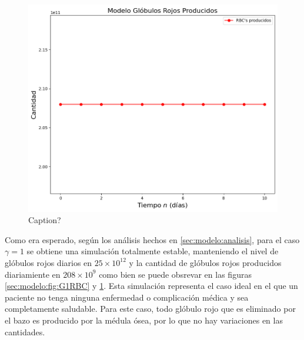 \begin{figure}[H]
    \centering
    \includegraphics[scale=0.57]{figures/BaseG1SC.png}
    \caption{Caption?}
    \label{sec:modelo:fig:G1SC}
\end{figure}
Como era esperado, según los análisis hechos en \ref{sec:modelo:analisis}, para el caso $\gamma = 1$ se obtiene una simulación totalmente estable, manteniendo el nivel de glóbulos rojos diarios en $25\times 10^{12}$ y la cantidad de glóbulos rojos producidos diariamiente en $208\times 10^{9}$ como bien se puede obsrevar en las figuras \ref{sec:modelo:fig:G1RBC} y \ref{sec:modelo:fig:G1SC}. Esta simulación representa el caso ideal en el que un paciente no tenga ninguna enfermedad o complicación médica y sea completamente saludable. Para este caso, todo glóbulo rojo que es eliminado por el bazo es producido por la médula ósea, por lo que no hay variaciones en las cantidades.

